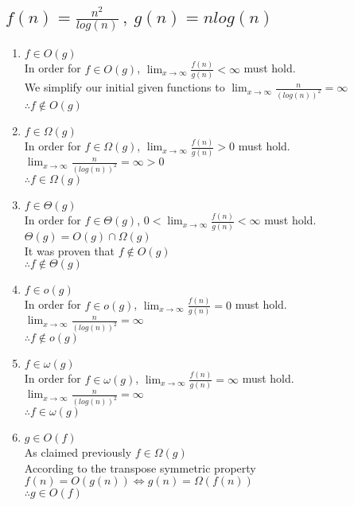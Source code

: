 \documentclass[11pt]{article}
\begin{document}
	\subsection{$f(n)=\frac{n^2}{log(n)} \ , \ g(n) = nlog(n)$}
		\begin{enumerate}
			\item $f \in O(g)$ \\
				In order for $f \in O(g)$, $\lim_{x \to \infty} \frac{f(n)}{g(n)} < \infty$	must hold. \\
				We simplify our initial given functions to $\lim_{x \to \infty} \frac{n}{(log(n))^{2}} = \infty$ \\
				$\therefore f \notin O(g)$
				
			\item $f \in \Omega(g)$\\
				In order for $f \in \Omega(g)$, $\lim_{x \to \infty} \frac{f(n)}{g(n)} > 0$	must hold. \\
				$\lim_{x \to \infty} \frac{n}{(log(n))^{2}} = \infty > 0$ \\
				$\therefore f \in \Omega(g)$
				
			\item $f \in \Theta(g)$ \\
				In order for $f \in \Theta(g)$, $0 < \lim_{x \to \infty} \frac{f(n)}{g(n)} < \infty$	must hold. \\
				$\Theta(g) = O(g) \cap \Omega(g)$ \\
				It was proven that $f \notin O(g)$\\
				$\therefore f \notin \Theta(g)$
			
			\item $f \in o(g)$ \\
				In order for $f \in o(g)$, $\lim_{x \to \infty} \frac{f(n)}{g(n)} = 0$	must hold. \\
				$\lim_{x \to \infty} \frac{n}{(log(n))^{2}} = \infty $\\
				$\therefore f \notin o(g)$
			
			\item $f \in \omega(g)$ \\
				In order for $f \in \omega(g)$, $\lim_{x \to \infty} \frac{f(n)}{g(n)} = \infty$	must hold. \\
				$\lim_{x \to \infty} \frac{n}{(log(n))^{2}} = \infty$ \\
				$\therefore f \in \omega(g)$
			
			
			\item $g \in O(f)$ \\
				As claimed previously $ f \in \Omega(g)$ \\ 
				According to the transpose symmetric property $f(n) = O(g(n)) \Leftrightarrow g(n) = \Omega (f(n)) $ \\
				$\therefore g \in O(f)$
				

\end{enumerate}
\end{document}

